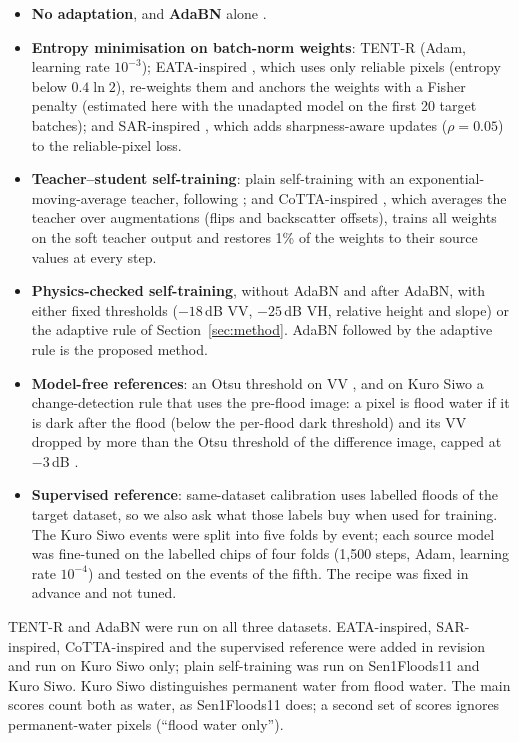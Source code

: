 \documentclass[a4paper,fleqn]{cas-sc}
\begin{document}
\begin{itemize}
\item \textbf{No adaptation}, and \textbf{AdaBN} alone \citep{li2018adabn}.
\item \textbf{Entropy minimisation on batch-norm weights}: TENT-R \citep{wang2021tent} (Adam, learning rate $10^{-3}$); EATA-inspired \citep{niu2022eata}, which uses only reliable pixels (entropy below $0.4\ln 2$), re-weights them and anchors the weights with a Fisher penalty (estimated here with the unadapted model on the first 20 target batches); and SAR-inspired \citep{niu2023sar}, which adds sharpness-aware updates ($\rho=0.05$) to the reliable-pixel loss.
\item \textbf{Teacher--student self-training}: plain self-training with an exponential-moving-average teacher, following \citet{chen2026cimttda}; and CoTTA-inspired \citep{wang2022cotta}, which averages the teacher over augmentations (flips and backscatter offsets), trains all weights on the soft teacher output and restores 1\% of the weights to their source values at every step.
\item \textbf{Physics-checked self-training}, without AdaBN and after AdaBN, with either fixed thresholds ($-18$\,dB VV, $-25$\,dB VH, relative height and slope) or the adaptive rule of Section~\ref{sec:method}. AdaBN followed by the adaptive rule is the proposed method.
\item \textbf{Model-free references}: an Otsu threshold on VV \citep{otsu1979threshold}, and on Kuro Siwo a change-detection rule that uses the pre-flood image: a pixel is flood water if it is dark after the flood (below the per-flood dark threshold) and its VV dropped by more than the Otsu threshold of the difference image, capped at $-3$\,dB \citep{giustarini2013change,clement2018multitemporal}.
\item \textbf{Supervised reference}: same-dataset calibration uses labelled floods of the target dataset, so we also ask what those labels buy when used for training. The Kuro Siwo events were split into five folds by event; each source model was fine-tuned on the labelled chips of four folds (1,500 steps, Adam, learning rate $10^{-4}$) and tested on the events of the fifth. The recipe was fixed in advance and not tuned.
\end{itemize}
TENT-R and AdaBN were run on all three datasets. EATA-inspired, SAR-inspired, CoTTA-inspired and the supervised reference were added in revision and run on Kuro Siwo only; plain self-training was run on Sen1Floods11 and Kuro Siwo. Kuro Siwo distinguishes permanent water from flood water. The main scores count both as water, as Sen1Floods11 does; a second set of scores ignores permanent-water pixels (``flood water only'').
\end{document}
